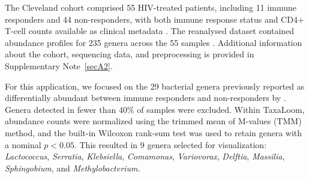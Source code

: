 \documentclass[pdflatex,sn-vancouver-num]{sn-jnl}%
\theoremstyle{thmstyleone}%
\theoremstyle{thmstyletwo}%
\theoremstyle{thmstylethree}%
\begin{document}
The Cleveland cohort comprised 55 HIV-treated patients, including 11 immune responders and 44 non-responders, with both immune response status and CD4+ T-cell counts available as clinical metadata \citep{lederman_immunologic_2011,nganou-makamdop_translocated_2021}. The reanalysed dataset contained abundance profiles for 235 genera across the 55 samples \citep{colajanni_benchmarking_2026}. Additional information about the cohort, sequencing data, and preprocessing is provided in Supplementary Note~\ref{secA2}.

For this application, we focused on the 29 bacterial genera previously reported as differentially abundant between immune responders and non-responders by \citet{nganou-makamdop_translocated_2021}. Genera detected in fewer than 40\% of samples were excluded. Within TaxaLoom, abundance counts were normalized using the trimmed mean of M-values (TMM) method, and the built-in Wilcoxon rank-sum test was used to retain genera with a nominal $p<0.05$. This resulted in 9 genera selected for visualization: \textit{Lactococcus}, \textit{Serratia}, \textit{Klebsiella}, \textit{Comamonas}, \textit{Variovorax}, \textit{Delftia}, \textit{Massilia}, \textit{Sphingobium}, and \textit{Methylobacterium}.





\end{document}
